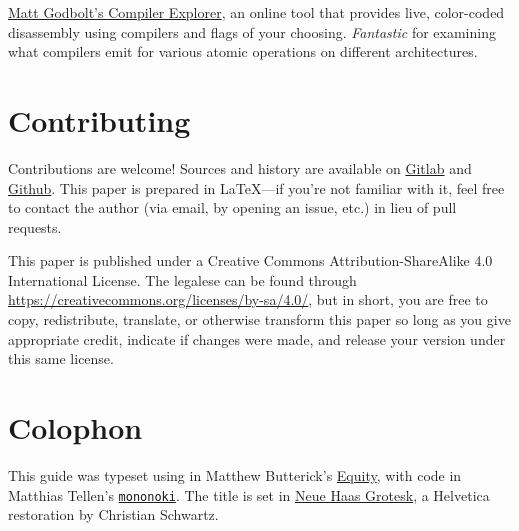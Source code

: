 \documentclass[fontsize=\bodyfontsize, numbers=endperiod]{scrartcl}
\begin{document}
\begin{adjustwidth}{1in}{1in}
\href{https://godbolt.org/}{Matt Godbolt's Compiler Explorer},
an online tool that provides live, color-coded disassembly using compilers and
flags of your choosing.
\emph{Fantastic} for examining what compilers emit for various
atomic operations on different architectures.

\section{Contributing}

Contributions are welcome!
Sources and history are available on
\href{https://gitlab.com/mrkline/concurrency-primer}{Gitlab}
and
\href{https://github.com/mrkline/concurrency-primer}{Github}.
This paper is prepared in \LaTeX{}---if you're not familiar with it,
feel free to contact the author
(via email, by opening an issue, etc.)
in lieu of pull requests.

This paper is published under a
Creative Commons Attribution-ShareAlike 4.0 International License.
The legalese can be found through
\url{https://creativecommons.org/licenses/by-sa/4.0/},
but in short,
you are free to copy, redistribute, translate, or otherwise transform this paper
so long as you give appropriate credit, indicate if changes were made,
and release your version under this same license.

\section{Colophon}

This guide was typeset using \LuaLaTeX{}
in Matthew Butterick's
\href{https://typographyforlawyers.com/equity.html}{Equity},
with code in Matthias Tellen's
\href{https://madmalik.github.io/mononoki/}{\texttt{mononoki}}.
The title is set in
\href{http://www.fontbureau.com/NHG/}{\textsf{\small Neue Haas Grotesk}},
a Helvetica restoration by Christian Schwartz.
\end{adjustwidth}
\end{document}
